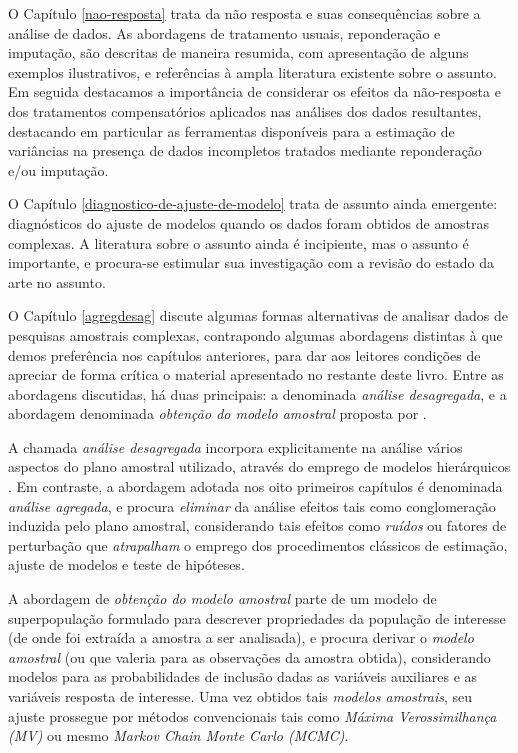 \documentclass[
]{book}
\begin{document}
O Capítulo \ref{nao-resposta} trata da não resposta e suas consequências sobre a análise
de dados. As abordagens de tratamento usuais, reponderação e imputação, são descritas de
maneira resumida, com apresentação de alguns exemplos ilustrativos, e referências à ampla
literatura existente sobre o assunto. Em seguida destacamos a importância de considerar
os efeitos da não-resposta e dos tratamentos compensatórios aplicados nas análises dos
dados resultantes, destacando em particular as ferramentas disponíveis para a estimação
de variâncias na presença de dados incompletos tratados mediante reponderação e/ou imputação.

O Capítulo \ref{diagnostico-de-ajuste-de-modelo} trata de assunto ainda emergente: diagnósticos
do ajuste de modelos quando os dados foram obtidos de amostras complexas. A literatura sobre
o assunto ainda é incipiente, mas o assunto é importante, e procura-se estimular sua investigação
com a revisão do estado da arte no assunto.

O Capítulo \ref{agregdesag} discute algumas formas alternativas de analisar dados de
pesquisas amostrais complexas, contrapondo algumas abordagens distintas à que demos preferência
nos capítulos anteriores, para dar aos leitores condições de apreciar de forma crítica
o material apresentado no restante deste livro. Entre as abordagens discutidas, há duas
principais: a denominada \emph{análise desagregada}, e a abordagem denominada
\emph{obtenção do modelo amostral} proposta por \citep{PKR}.

A chamada \emph{análise desagregada} incorpora explicitamente na análise vários aspectos do
plano amostral utilizado, através do emprego de modelos hierárquicos \citep{bryk}.
Em contraste, a abordagem adotada nos oito primeiros capítulos é denominada \emph{análise agregada},
e procura \emph{eliminar} da análise efeitos tais como conglomeração induzida pelo plano amostral,
considerando tais efeitos como \emph{ruídos} ou fatores de perturbação que \emph{atrapalham} o emprego dos procedimentos clássicos de estimação, ajuste de modelos e teste de hipóteses.

A abordagem de \emph{obtenção do modelo amostral} parte de um modelo de superpopulação formulado para
descrever propriedades da população de interesse (de onde foi extraída a amostra a ser analisada),
e procura derivar o \emph{modelo amostral} (ou que valeria para as observações da amostra obtida),
considerando modelos para as probabilidades de inclusão dadas as variáveis auxiliares e
as variáveis resposta de interesse. Uma vez obtidos tais \emph{modelos amostrais}, seu ajuste prossegue
por métodos convencionais tais como \emph{Máxima Verossimilhança (MV)} ou mesmo
\emph{Markov Chain Monte Carlo (MCMC)}.
\end{document}
